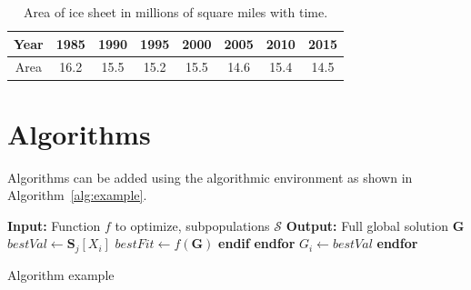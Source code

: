 \begin{table}[htbp]
  \centering
  \caption[Area of ice sheet]{Area of ice sheet in millions of square miles with time.}
  \label{tab:ice}
  \begin{tabular}{c | ccccccc}
    Year  & 1985 & 1990 & 1995 & 2000 & 2005 & 2010 & 2015\\\hline
    Area  & 16.2 & 15.5   & 15.2  & 15.5  & 14.6 & 15.4 & 14.5 
  \end{tabular}
\end{table}

\section{Algorithms}\label{Sect:Alg}
Algorithms can be added using the algorithmic environment as shown in Algorithm~\ref{alg:example}.
\begin{algorithm}[htbp]
\begin{algorithmic}[1]
\STATE \textbf{Input:} Function $f$ to optimize, subpopulations $\mathcal{S}$
\STATE \textbf{Output:} Full global solution $\boldsymbol{G}$
\STATE {}
\STATE {} \label{opa_compete:loop:1}
\STATE {}
\STATE \hspace{8pt}{$bestFit \leftarrow \infty$} \label{opa_compete:init:1}
\STATE {} \label{opa_compete:init:2}
\STATE {}
\STATE {}
\STATE {}
\STATE {} \label{opa_compete:compare:1}
\STATE {}
\STATE {}
\STATE \hspace{24pt}$bestVal \leftarrow \boldsymbol{S}_j[X_i]$
\STATE \hspace{24pt}$bestFit \leftarrow f(\boldsymbol{G})$
\STATE \hspace{16pt}\textbf{endif}
\STATE \hspace{8pt}\textbf{endfor} \label{opa_compete:compare:2}
\STATE {}
\STATE \hspace{8pt}$G_i \leftarrow bestVal$
\STATE \textbf{endfor}
\RETURN
\end{algorithmic}
\caption{Algorithm example}
\label{alg:example}
\end{algorithm} 

